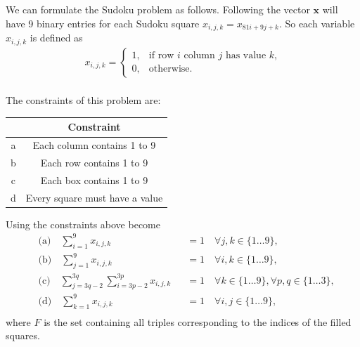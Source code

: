 \documentclass{article}
\begin{document}
\hspace{92pt}\begin{lpsudoku}[scale=0.5]
\end{lpsudoku}\\
\\

\noindent We can formulate the Sudoku problem as follows. Following \cite[p.~1]{mücke2024sudoku} the vector \(\mathbf{x}\) will have 9 binary entries for each Sudoku square \(x_{i,j,k} = x_{81i + 9j + k}\). So each variable \(x_{i,j,k}\) is defined as
\begin{align*}
    x_{i,j,k} = \begin{cases}
        1, & \text{if row \(i\) column \(j\) has value \(k\),} \\
        0, & \text{otherwise.}
    \end{cases}
\end{align*}\\

\noindent The constraints of this problem are:
\begin{center}
\begin{tabular}{ |c|c| } 
 \hline
   & Constraint\\ 
 \hline
 a & Each column contains 1 to 9\\ 
 b & Each row contains 1 to 9\\
 c & Each box contains 1 to 9\\
 d & Every square must have a value\\
 \hline
\end{tabular}
\end{center}

\noindent Using \cite[p.~326]{ILPsudoku} the constraints above become
\begin{align*}
&\text{(a)} \quad \sum_{i=1}^9 x_{i,j,k} &&= 1\quad \forall j,k \in \{1 \dots 9\}, \\
&\text{(b)} \quad \sum_{j=1}^9 x_{i,j,k} &&= 1\quad \forall i,k \in \{1 \dots 9\}, \\
&\text{(c)} \quad \sum_{j=3q-2}^{3q} \sum_{i=3p-2}^{3p} x_{i,j,k} &&= 1\quad \forall k \in \{1 \dots 9\}, \forall p,q \in \{1 \dots 3\},\\
&\text{(d)} \quad \sum_{k=1}^9 x_{i,j,k} &&= 1\quad \forall i,j \in \{1 \dots 9\}, \\
\end{align*}
where \(F\) is the set containing all triples corresponding to the indices of the filled squares. \\
\end{document}
